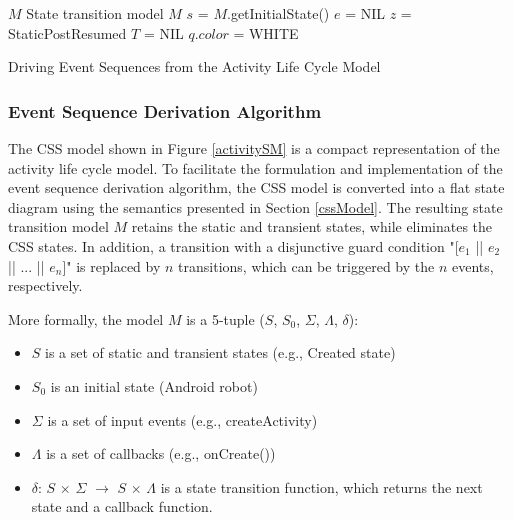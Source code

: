 \documentclass[10pt]{elsarticle}
\newlength{\algorithmwidth}
\begin{document}
\algnewcommand{}
\algnewcommand\INPUT{\item[\algorithmicinput]}


\def\therule{\makebox[\algorithmicindent][l]{\hspace*{.5em}\vrule height .75\baselineskip depth .25\baselineskip}}

\makeatother
\setlength{\algorithmwidth}{.9\textwidth}

\begin{algorithm}[ht]
 \begin{algorithmic}[1]
\INPUT 
\Statex $M$ \Comment State transition model
 {$M$}
	\State $s$ = $M$.getInitialState()  
	\State $e$ = NIL 
	\State $z$ = StaticPostResumed 
	\State $T$ = NIL 
		\State $q$.$color$ = WHITE
	\EndFor
\EndProcedure
  \end{algorithmic}
 \caption{Driving Event Sequences from the Activity Life Cycle Model}\label{eventDerivationActivity}
\end{algorithm}


\subsubsection{Event Sequence Derivation Algorithm}

The CSS model shown in Figure \ref{activitySM} is a compact representation of the activity life cycle model. To facilitate the formulation and implementation of the event sequence derivation algorithm, the CSS model is converted into a flat state diagram using the semantics presented in Section \ref{cssModel}. The resulting state transition model $M$ retains the static and transient states, while eliminates the CSS states. In addition, a transition with a disjunctive guard condition "[$e_1$ || $e_2$ || ... || $e_n$]" is replaced by $n$ transitions, which can be triggered by the $n$ events, respectively. 

More formally, the model $M$ is a 5-tuple ($S$, $S_0$, $\Sigma$, $\Lambda$, $\delta$):

\begin{itemize}
\item $S$ is a set of static and transient states (e.g., Created state)
\item $S_0$ is an initial state (Android robot)
\item $\Sigma$ is a set of input events (e.g., createActivity)
\item $\Lambda$ is a set of callbacks (e.g., {\ttfamily onCreate()})
\item $\delta$: $S$ $\times$ $\Sigma$ $\rightarrow$ $S$ $\times$ $\Lambda$ is a state transition function, which returns the next state and a callback function. 
\end{itemize}
\end{document}
